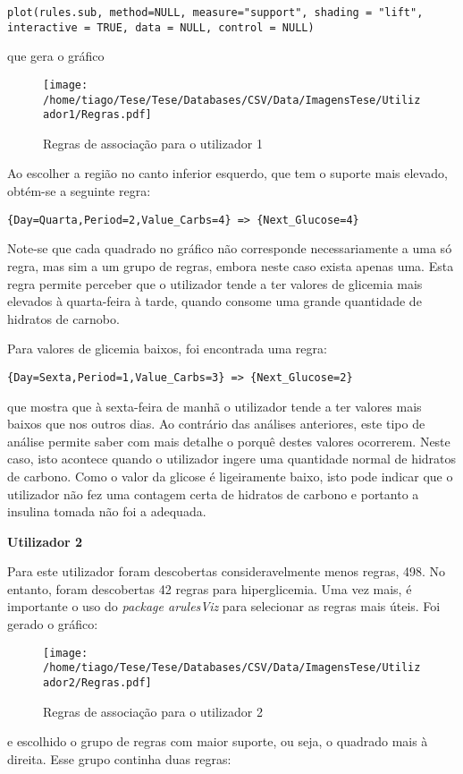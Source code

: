 \begin{lstlisting}
plot(rules.sub, method=NULL, measure="support", shading = "lift", interactive = TRUE, data = NULL, control = NULL)
\end{lstlisting}
que gera o gráfico

\begin{figure}[H]
\centering
\texttt{[image: /home/tiago/Tese/Tese/Databases/CSV/Data/ImagensTese/Utilizador1/Regras.pdf]}
\caption{Regras de associação para o utilizador 1}
\end{figure}
Ao escolher a região no canto inferior esquerdo, que tem o suporte mais elevado, obtém-se a seguinte regra:

\begin{lstlisting}
{Day=Quarta,Period=2,Value_Carbs=4} => {Next_Glucose=4}

\end{lstlisting}
Note-se que cada quadrado no gráfico não corresponde necessariamente a uma só regra, mas sim a um grupo de regras, embora neste caso exista apenas uma. Esta regra permite perceber que o utilizador tende a ter valores de glicemia mais elevados à quarta-feira à tarde, quando consome uma grande quantidade de hidratos de carnobo.

Para valores de glicemia baixos, foi encontrada uma regra:

\begin{lstlisting}
{Day=Sexta,Period=1,Value_Carbs=3} => {Next_Glucose=2}
\end{lstlisting}
que mostra que à sexta-feira de manhã o utilizador tende a ter valores mais baixos que nos outros dias. Ao contrário das análises anteriores, este tipo de análise permite saber com mais detalhe o porquê destes valores ocorrerem. Neste caso, isto acontece quando o utilizador ingere uma quantidade normal de hidratos de carbono. Como o valor da glicose é ligeiramente baixo, isto pode indicar que o utilizador não fez uma contagem certa de hidratos de carbono e portanto a insulina tomada não foi a adequada.


\textbf{Utilizador 2}

Para este utilizador foram descobertas consideravelmente menos regras, 498. No entanto, foram descobertas 42 regras para hiperglicemia. Uma vez mais, é importante o uso do \textit{package arulesViz} para selecionar as regras mais úteis. Foi gerado o gráfico:


\begin{figure}[H]
\centering
\texttt{[image: /home/tiago/Tese/Tese/Databases/CSV/Data/ImagensTese/Utilizador2/Regras.pdf]}
\caption{Regras de associação para o utilizador 2}
\end{figure}
e escolhido o grupo de regras com maior suporte, ou seja, o quadrado mais à direita. Esse grupo continha duas regras:

